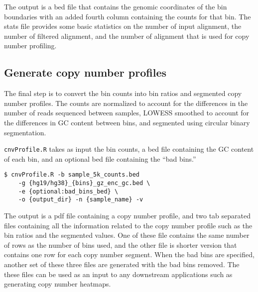 \documentclass[11pt]{article}
\newcommand{\prog}[1]{\texttt{#1}}
\begin{document}
The output is a bed file that contains the genomic coordinates of the
bin boundaries with an added fourth column containing the counts for
that bin. The stats file provides some basic statistics on the number of
input alignment, the number of filtered alignment, and the number of
alignment that is used for copy number profiling.

\subsection{Generate copy number profiles}
The final step is to convert the bin counts into bin ratios and segmented
copy number profiles. The counts are normalized to account for the
differences in the number of reads sequenced between samples, LOWESS
smoothed to account for the differences in GC content between bins, and
segmented using circular binary segmentation.

\prog{cnvProfile.R} takes as input the bin counts, a bed file containing
the GC content of each bin, and an optional bed file containing the ``bad
bins.''
\begin{verbatim}
$ cnvProfile.R -b sample_5k_counts.bed 
    -g {hg19/hg38}_{bins}_gz_enc_gc.bed \
    -e {optional:bad_bins_bed} \
    -o {output_dir} -n {sample_name} -v
\end{verbatim}

The output is a pdf file containing a copy number profile, and two tab
separated files containing all the information related to the copy number
profile such as the bin ratios and the segmented values. One of these
file contains the same number of rows as the number of bins used, and
the other file is shorter version that contains one row for each copy
number segment. When the bad bins are specified, another set of these
three files are generated with the bad bins removed.
%
The these files can be used as an input to any downstream
applications such as generating copy number heatmaps.






\end{document}
